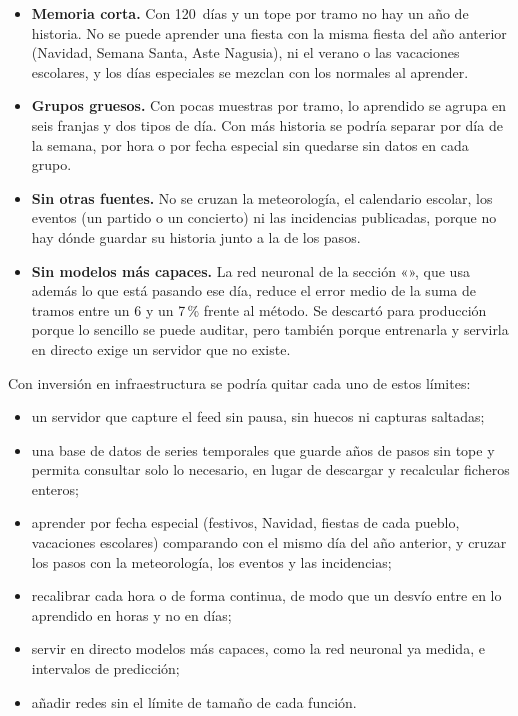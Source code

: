 \begin{itemize}
  \item \textbf{Memoria corta.} Con 120~días y un tope por tramo no hay un año de historia. No se puede aprender una
        fiesta con la misma fiesta del año anterior (Navidad, Semana Santa, Aste Nagusia), ni el verano o las
        vacaciones escolares, y los días especiales se mezclan con los normales al aprender.
  \item \textbf{Grupos gruesos.} Con pocas muestras por tramo, lo aprendido se agrupa en seis franjas y dos tipos de
        día. Con más historia se podría separar por día de la semana, por hora o por fecha especial sin quedarse sin
        datos en cada grupo.
  \item \textbf{Sin otras fuentes.} No se cruzan la meteorología, el calendario escolar, los eventos (un partido o un
        concierto) ni las incidencias publicadas, porque no hay dónde guardar su historia junto a la de los pasos.
  \item \textbf{Sin modelos más capaces.} La red neuronal de la sección «», que usa además
        lo que está pasando ese día, reduce el error medio de la suma de tramos entre un 6 y un 7\,\% frente al método. Se descartó para producción porque lo
        sencillo se puede auditar, pero también porque entrenarla y servirla en directo exige un servidor que no existe.
\end{itemize}

\noindent Con inversión en infraestructura se podría quitar cada uno de estos límites:

\begin{itemize}
  \item un servidor que capture el feed sin pausa, sin huecos ni capturas saltadas;
  \item una base de datos de series temporales que guarde años de pasos sin tope y permita consultar solo lo necesario,
        en lugar de descargar y recalcular ficheros enteros;
  \item aprender por fecha especial (festivos, Navidad, fiestas de cada pueblo, vacaciones escolares) comparando con
        el mismo día del año anterior, y cruzar los pasos con la meteorología, los eventos y las incidencias;
  \item recalibrar cada hora o de forma continua, de modo que un desvío entre en lo aprendido en horas y no en días;
  \item servir en directo modelos más capaces, como la red neuronal ya medida, e intervalos de predicción;
  \item añadir redes sin el límite de tamaño de cada función.
\end{itemize}

